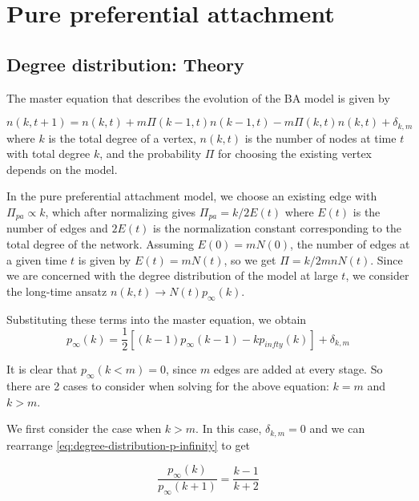 \section{Pure preferential attachment}\label{section:pure-preferential-attachment}

\subsection{Degree distribution: Theory}\label{subsection:ppa-degree-distribution}
The master equation that describes the evolution of the BA model is given by

\begin{equation}
	n(k, t+1) = n(k, t) + m \Pi(k-1, t)n(k-1, t) - m \Pi(k, t)n(k, t) + \delta_{k,m}
	\label{eq:master}
\end{equation}
where $k$ is the total degree of a vertex, $n(k, t)$ is the number of nodes at time $t$ with total degree $k$, and the probability $\Pi$ for choosing the existing vertex depends on the model. 

In the pure preferential attachment model, we choose an existing edge with $\Pi_{pa} \propto k$, which after normalizing gives $\Pi_{pa} = k/ 2E(t)$ where $E(t)$ is the number of edges and $2E(t)$ is the normalization constant corresponding to the total degree of the network. Assuming $E(0) = mN(0)$, the number of edges at a given time $t$ is given by $E(t) = mN(t)$, so we get $\Pi = k / 2mnN(t)$. Since we are concerned with the degree distribution of the model at large $t$, we consider the long-time ansatz $n(k, t) \rightarrow N(t) p_{\infty}(k)$. 

Substituting these terms into the master equation, we obtain 
\begin{equation}
	p_{\infty}(k) = \frac{1}{2}[(k-1)p_{\infty}(k-1) - kp_{infty}(k)] + \delta_{k,m}
	\label{eq:degree-distribution-p-infinity}
\end{equation}

It is clear that $p_{\infty}(k < m) = 0$, since $m$ edges are added at every stage. So there are 2 cases to consider when solving for the above equation: $k = m$ and $k > m$. 

We first consider the case when $k > m$. In this case, $\delta_{k,m} = 0$ and we can rearrange \autoref{eq:degree-distribution-p-infinity} to get

\begin{equation}
	\frac{p_{\infty}(k)}{p_{\infty}(k+1)} = \frac{k-1}{k+2}
	\label{eq:p-infinity-k-greater-m}	
\end{equation}

